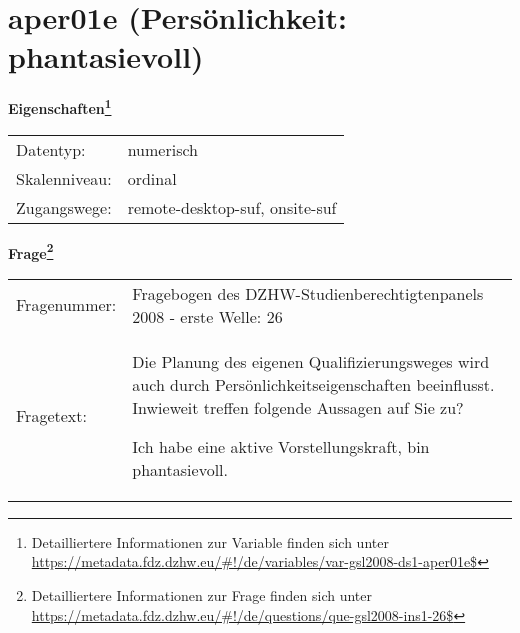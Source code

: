 
    \setcounter{footnote}{0}

    \vspace*{-1.8cm}
	\section{aper01e (Persönlichkeit: phantasievoll)}
	\label{section:aper01e}



    \vspace*{0.5cm}
    \noindent\textbf{Eigenschaften\footnote{Detailliertere Informationen zur Variable finden sich unter
		\url{https://metadata.fdz.dzhw.eu/\#!/de/variables/var-gsl2008-ds1-aper01e$}}}\\
	\begin{tabularx}{\hsize}{@{}lX}
	Datentyp: & numerisch \\
	Skalenniveau: & ordinal \\
	Zugangswege: &
	  remote-desktop-suf, 
	  onsite-suf
 \\
    \end{tabularx}



				\vspace*{0.5cm}
                \noindent\textbf{Frage\footnote{Detailliertere Informationen zur Frage finden sich unter
		              \url{https://metadata.fdz.dzhw.eu/\#!/de/questions/que-gsl2008-ins1-26$}}}\\
				\begin{tabularx}{\hsize}{@{}lX}
					Fragenummer: &
					  Fragebogen des DZHW-Studienberechtigtenpanels 2008 - erste Welle:
					  26
 \\
					Fragetext: & Die Planung des eigenen Qualifizierungsweges wird auch durch Persönlichkeitseigenschaften beeinflusst. Inwieweit treffen folgende Aussagen auf Sie zu?\par  Ich habe eine aktive Vorstellungskraft, bin phantasievoll. \\
				\end{tabularx}





